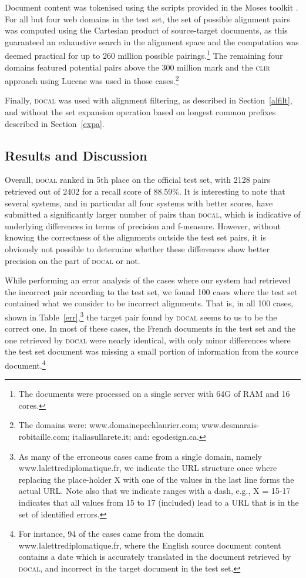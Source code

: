 \documentclass[11pt]{article}
\begin{document}
Document content was tokenised using the scripts provided in the Moses toolkit \cite{koehn2007moses}. For all but four web domains in the test set, the set of possible alignment pairs was computed using the Cartesian product of source-target documents, as this guaranteed an exhaustive search in the alignment space and the computation was deemed practical for up to 260 million possible pairings.\footnote{The documents were processed on a single server with 64G of RAM and 16 cores.} The remaining four domains featured potential pairs above the 300 million mark and the \textsc{clir} approach using Lucene was used in those cases.\footnote{The domains were: www.domainepechlaurier.com; www.desmarais-robitaille.com; italiasullarete.it; and: egodesign.ca.}

Finally, \textsc{docal} was used with alignment filtering, as described in Section~\ref{alfilt}, and without the set expansion operation based on longest common prefixes described in Section~\ref{expa}.

\subsection{Results and Discussion}
\label{sres}

Overall, \textsc{docal} ranked in 5th place on the official test set, with 2128 pairs retrieved out of 2402 for a recall score of 88.59\%. It is interesting to note that several systems, and in particular all four systems with better scores, have submitted a significantly larger number of pairs than \textsc{docal}, which is indicative of underlying differences in terms of precision and f-measure. However, without knowing the correctness of the alignments outside the test set pairs, it is obviously not possible to determine whether these differences show better precision on the part of \textsc{docal} or not.


While performing an error analysis of the cases where our system had retrieved the incorrect pair according to the test set, we found 100 cases where the test set contained what we consider to be incorrect alignments. That is, in all 100 cases, shown in Table~\ref{err},\footnote{As many of the erroneous cases came from a single domain, namely www.lalettrediplomatique.fr, we indicate the URL structure once where replacing the place-holder X with one of the values in the last line forms the actual URL. Note also that we indicate ranges with a dash, e.g., X = 15-17 indicates that all values from 15 to 17 (included) lead to a URL that is in the set of identified errors.} the target pair found by \textsc{docal} seems to us to be the correct one. In most of these cases, the French documents in the test set and the one retrieved by \textsc{docal} were nearly identical, with only minor differences where the test set document was missing a small portion of information from the source document.\footnote{For instance, 94 of the cases came from the domain www.lalettrediplomatique.fr, where the English source document content contains a date which is accurately translated in the document retrieved by \textsc{docal}, and incorrect in the target document in the test set.}
\end{document}
